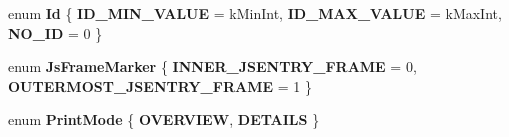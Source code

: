\begin{DoxyCompactItemize}
\item 
\hypertarget{classv8_1_1internal_1_1_b_a_s_e___e_m_b_e_d_d_e_d_aaaee46232f5b050c6f414648c7c9188c}{}enum {\bfseries Id} \{ {\bfseries I\+D\+\_\+\+M\+I\+N\+\_\+\+V\+A\+L\+U\+E} = k\+Min\+Int, 
{\bfseries I\+D\+\_\+\+M\+A\+X\+\_\+\+V\+A\+L\+U\+E} = k\+Max\+Int, 
{\bfseries N\+O\+\_\+\+I\+D} = 0
 \}\label{classv8_1_1internal_1_1_b_a_s_e___e_m_b_e_d_d_e_d_aaaee46232f5b050c6f414648c7c9188c}

\item 
\hypertarget{classv8_1_1internal_1_1_b_a_s_e___e_m_b_e_d_d_e_d_a6e8f0f08e4e94d957675dd02223a8c1a}{}enum {\bfseries Js\+Frame\+Marker} \{ {\bfseries I\+N\+N\+E\+R\+\_\+\+J\+S\+E\+N\+T\+R\+Y\+\_\+\+F\+R\+A\+M\+E} = 0, 
{\bfseries O\+U\+T\+E\+R\+M\+O\+S\+T\+\_\+\+J\+S\+E\+N\+T\+R\+Y\+\_\+\+F\+R\+A\+M\+E} = 1
 \}\label{classv8_1_1internal_1_1_b_a_s_e___e_m_b_e_d_d_e_d_a6e8f0f08e4e94d957675dd02223a8c1a}

\item 
\hypertarget{classv8_1_1internal_1_1_b_a_s_e___e_m_b_e_d_d_e_d_a7db761bcaf86c69d87422f9740db001b}{}enum {\bfseries Print\+Mode} \{ {\bfseries O\+V\+E\+R\+V\+I\+E\+W}, 
{\bfseries D\+E\+T\+A\+I\+L\+S}
 \}\label{classv8_1_1internal_1_1_b_a_s_e___e_m_b_e_d_d_e_d_a7db761bcaf86c69d87422f9740db001b}


\end{DoxyCompactItemize}
